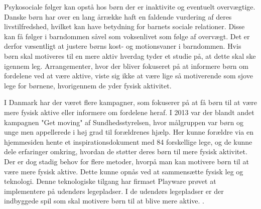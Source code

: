 
Psykosociale følger kan opstå hos børn der er inaktivite og eventuelt overvægtige. Danske børn har over en lang årrække haft en faldende vurdering af deres livstilfredshed, hvilket kan have betydning for barnets sociale relationer. Disse kan få følger i barndommen såvel som voksenlivet som følge af overvægt. Det er derfor væsentligt at justere børns kost- og motionsvaner i barndommen. \citep{Universitet2014,StatensInstitutforFolkesundhed2007} Hvis børn skal motiveres til en mere aktiv hverdag tyder et studie på, at dette skal ske igennem leg. Arrangementer, hvor der bliver fokuseret på at informere børn om fordelene ved at være aktive, viste sig ikke at være lige så motiverende som sjove lege for børnene, hvorigennem de yder fysisk aktivitet. %
\citep{J.Sebire2013}

I Danmark har der været flere kampagner, som fokuserer på at få børn til at være mere fysisk aktive eller informere om fordelene heraf. I 2013 var der blandt andet kampagnen "Get moving" af Sundhedsstyrelsen, hvor målgruppen var børn og unge men appellerede i høj grad til forældrenes hjælp. Her kunne forældre via en hjemmesiden hente et inspirationsdokument med 84 forskellige lege, og de kunne dele erfaringer omkring, hvordan de støtter deres børn til mere fysisk aktivitet.  \citep{Sundhedsstyrelsen2013} Der er dog stadig behov for flere metoder, hvorpå man kan motivere børn til at være mere fysisk aktive. Dette kunne opnås ved at sammensætte fysisk leg og teknologi. Denne teknologiske tilgang har firmaet Playware prøvet at implementere på udendørs legepladser. I de udendørs legepladser er der indbyggede spil som skal motivere børn til at blive mere aktive.  \citep{Rishoej2010}.

